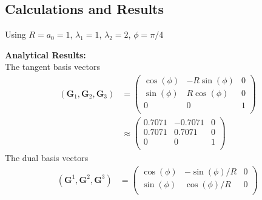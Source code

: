 \documentclass[../main.tex]{subfiles}
\begin{document}
\subsection{Calculations and Results}


Using $R = a_0 = 1$, $\lambda_1 = 1$, $\lambda_2 = 2$, $\phi = \pi/4$

\begin{minipage}[t]{0.5\textwidth}
  \textbf{Analytical Results:}\\
	
  The tangent basis vectors
  \begin{align*}
    \left(\mathbf{G}_1,\mathbf{G}_2,\mathbf{G}_3\right) &=
                                                          \begin{pmatrix}
                                                            \cos(\phi) & -R\sin(\phi) & 0\\
                                                            \sin(\phi) &  R\cos(\phi)& 0\\
                                                            0 & 0 & 1\\
                                                          \end{pmatrix}\\
                                                        &\approx
                                                          \begin{pmatrix}
                                                            0.7071 & -0.7071 & 0\\
                                                            0.7071 &  0.7071 & 0\\
                                                            0& 0 & 1\\
                                                          \end{pmatrix}
  \end{align*}
  The dual basis vectors
  \begin{align*}
    \left(\mathbf{G}^1,\mathbf{G}^2,\mathbf{G}^3\right) &=
                                                          \begin{pmatrix}
                                                            \cos(\phi) & -\sin(\phi)/R & 0\\
                                                            \sin(\phi) &  \cos(\phi)/R& 0\\

\end{pmatrix}
\end{align*}
\end{minipage}
\end{document}
